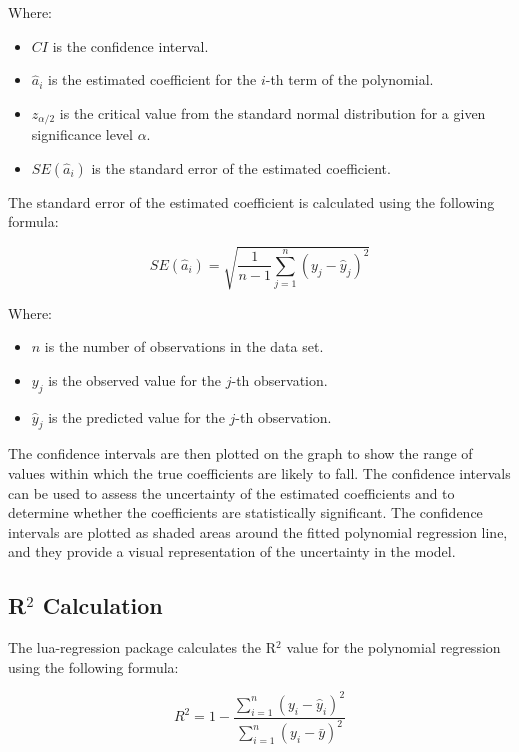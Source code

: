 \documentclass[11pt]{article}
\begin{document}
    
    Where:
    \begin{itemize}
        \item $CI$ is the confidence interval.
        \item $\hat{a}_i$ is the estimated coefficient for the $i$-th term of the polynomial.
        \item $z_{\alpha/2}$ is the critical value from the standard normal distribution for a given significance level $\alpha$.
        \item $SE(\hat{a}_i)$ is the standard error of the estimated coefficient.
    \end{itemize}

    The standard error of the estimated coefficient is calculated using the following formula:

    \begin{equation}
        SE(\hat{a}_i) = \sqrt{\frac{1}{n-1} \sum_{j=1}^{n} \left(y_j - \hat{y}_j\right)^2}
    \end{equation}

    
    Where:
    \begin{itemize}
        \item $n$ is the number of observations in the data set.
        \item $y_j$ is the observed value for the $j$-th observation.
        \item $\hat{y}_j$ is the predicted value for the $j$-th observation.
    \end{itemize}

    The confidence intervals are then plotted on the graph to show the range of values within which the true coefficients are likely to fall.
    The confidence intervals can be used to assess the uncertainty of the estimated coefficients and to determine whether the coefficients are statistically significant.
    The confidence intervals are plotted as shaded areas around the fitted polynomial regression line, and they provide a visual representation of the uncertainty in the model.

    \subsection{R$^2$ Calculation}

    The {\ttfamily lua-regression} package calculates the R$^2$ value for the polynomial regression using the following formula:

    \begin{equation}
        R^2 = 1 - \frac{\sum_{i=1}^{n} \left(y_i - \hat{y}_i\right)^2}{\sum_{i=1}^{n} \left(y_i - \bar{y}\right)^2}
    \end{equation}
\end{document}
